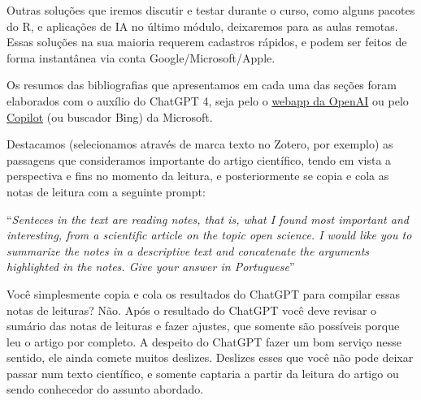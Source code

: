 \documentclass[
  a4paper,
]{book}
\newcounter{quartocallouttipno}
\newcommand{\quartocallouttip}[1]{\refstepcounter{quartocallouttipno}\label{#1}}
\begin{document}
Outras soluções que iremos discutir e testar durante o curso, como
alguns pacotes do R, e aplicações de IA no último módulo, deixaremos
para as aulas remotas. Essas soluções na sua maioria requerem cadastros
rápidos, e podem ser feitos de forma instantânea via conta
Google/Microsoft/Apple.

\begin{tcolorbox}[enhanced jigsaw, leftrule=.75mm, colframe=quarto-callout-important-color-frame, left=2mm, toprule=.15mm, titlerule=0mm, bottomrule=.15mm, toptitle=1mm, opacityback=0, coltitle=black, colback=white, breakable, title=\textcolor{quarto-callout-important-color}{\faExclamation}\hspace{0.5em}{Importante \ref*{tip-prompt}: ChatGPT para suas notas de leituras}, opacitybacktitle=0.6, arc=.35mm, bottomtitle=1mm, rightrule=.15mm, colbacktitle=quarto-callout-important-color!10!white]

\quartocallouttip{tip-prompt} 

Os resumos das bibliografias que apresentamos em cada uma das seções
foram elaborados com o auxílio do ChatGPT 4, seja pelo o
\href{https://chat.openai.com/}{webapp da OpenAI} ou pelo
\href{https://copilot.microsoft.com/}{Copilot} (ou buscador Bing) da
Microsoft.\vspace{0.5em}

Destacamos (selecionamos através de marca texto no Zotero, por exemplo)
as passagens que consideramos importante do artigo científico, tendo em
vista a perspectiva e fins no momento da leitura, e posteriormente se
copia e cola as notas de leitura com a seguinte prompt:\vspace{0.5em}

``\emph{Senteces in the text are reading notes, that is, what I found
most important and interesting, from a scientific article on the topic
open science. I would like you to summarize the notes in a descriptive
text and concatenate the arguments highlighted in the notes. Give your
answer in Portuguese}''

\end{tcolorbox}

\begin{tcolorbox}[enhanced jigsaw, leftrule=.75mm, colframe=quarto-callout-caution-color-frame, left=2mm, toprule=.15mm, titlerule=0mm, bottomrule=.15mm, toptitle=1mm, opacityback=0, coltitle=black, colback=white, breakable, title=\textcolor{quarto-callout-caution-color}{\faFire}\hspace{0.5em}{Não confie cegamente na IA}, opacitybacktitle=0.6, arc=.35mm, bottomtitle=1mm, rightrule=.15mm, colbacktitle=quarto-callout-caution-color!10!white]

Você simplesmente copia e cola os resultados do ChatGPT para compilar
essas notas de leituras? Não. Após o resultado do ChatGPT você deve
revisar o sumário das notas de leituras e fazer ajustes, que somente são
possíveis porque leu o artigo por completo. A despeito do ChatGPT fazer
um bom serviço nesse sentido, ele ainda comete muitos deslizes. Deslizes
esses que você não pode deixar passar num texto científico, e somente
captaria a partir da leitura do artigo ou sendo conhecedor do assunto
abordado.

\end{tcolorbox}
\end{document}
